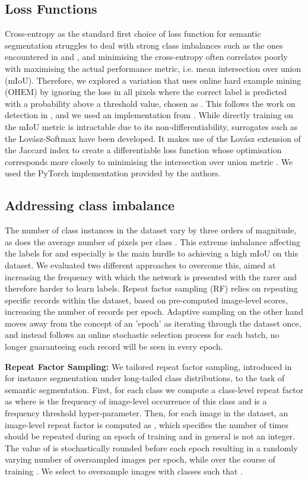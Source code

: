 \documentclass[runningheads]{llncs}
\newcommand{\lov}{Lov\'{a}sz}
\newcommand{\tbf}[1]{\textbf{#1}}
\newcommand{\ta}[1]{\textbf{}}
\begin{document}
\subsection{Loss Functions}\label{methods:loss}
Cross-entropy as the standard first choice of loss function for semantic segmentation struggles to deal with strong class imbalances such as the ones encountered in \ta2 and \ta3, and minimising the cross-entropy often correlates poorly with maximising the actual performance metric, i.e. mean intersection over union (mIoU). Therefore, we explored a variation that uses online hard example mining (OHEM) \cite{ohem} by ignoring the loss in all pixels where the correct label is predicted with a probability above a threshold value, chosen as . This follows the work on detection in \cite{ohem}, and we used an implementation from \cite{ohem_code}. While directly training on the mIoU metric is intractable due to its non-differentiability, surrogates such as the \lov{}-Softmax have been developed. It makes use of the \lov{} extension of the Jaccard index to create a differentiable loss function whose optimisation corresponds more closely to minimising the intersection over union metric \cite{Lovasz}. We used the PyTorch implementation provided by the authors.

\subsection{Addressing class imbalance}\label{methods:imbalance}
The number of class instances in the dataset vary by three orders of magnitude, as does the average number of pixels per class \cite{CaDIS}. This extreme imbalance affecting the labels for \ta2 and especially \ta3 is the main hurdle to achieving a high mIoU on this dataset. We evaluated two different approaches to overcome this, aimed at increasing the frequency with which the network is presented with the rarer and therefore harder to learn labels. Repeat factor sampling (RF) relies on repeating specific records within the dataset, based on pre-computed image-level scores, increasing the number of records per epoch. Adaptive sampling on the other hand moves away from the concept of an 'epoch' as iterating through the dataset once, and instead follows an online stochastic selection process for each batch, no longer guaranteeing each record will be seen in every epoch.

\noindent\tbf{Repeat Factor Sampling:}
We tailored repeat factor sampling, introduced in \cite{gupta2019lvis} for instance segmentation under long-tailed class distributions, to the task of semantic segmentation. First, for each class  we compute a class-level repeat factor as  where  is the frequency of image-level occurrence of this class and  is a frequency threshold hyper-parameter. Then, for each image  in the dataset, an image-level repeat factor is computed as , which specifies the number of times  should be repeated during an epoch of training and in general is not an integer. The value of  is stochastically rounded before each epoch resulting in a randomly varying number of oversampled images per epoch, while over the course of training . We select  to oversample images with classes such that .
\end{document}
